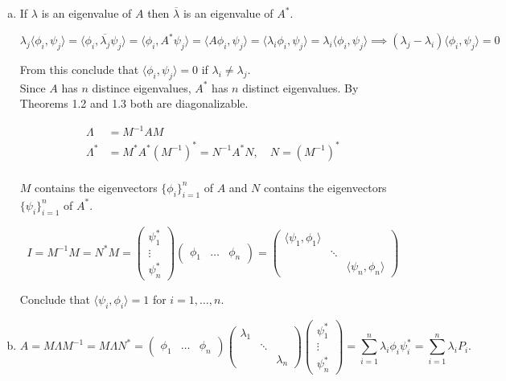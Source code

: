 \documentclass{article}
\begin{document}
\begin{enumerate}[a.]
\item If $\lambda$ is an eigenvalue of $A$ then $\overline{\lambda}$ is an eigenvalue of $A^*$. 

$$
\lambda_j \langle \phi_i, \psi_j \rangle 
= \langle \phi_i, \overline{\lambda_j} \psi_j \rangle
= \langle \phi_i, A^* \psi_j \rangle 
= \langle A\phi_i,\psi_j \rangle 
= \langle \lambda_i \phi_i ,\psi_j \rangle
= \lambda_i \langle \phi_i , \psi_j \rangle
\implies (\lambda_j - \lambda_i) \langle \phi_i , \psi_j \rangle = 0
$$

From this conclude that $\langle \phi_i,\psi_j \rangle = 0$ if $\lambda_i \neq \lambda_j$.\\

Since $A$ has $n$ distince eigenvalues, $A^*$ has $n$ distinct eigenvalues. By Theorems 1.2 and 1.3 both are diagonalizable.

\begin{align*}
\Lambda & =M^{-1}AM \\
\Lambda^* &= M^* A^* (M^{-1})^* = N^{-1}A^* N, \quad N= (M^{-1})^*\\
\end{align*}

$M$ contains the eigenvectors $\{\phi_i\}_{i=1}^n$ of $A$ and $N$ contains the eigenvectors $\{\psi_i\}_{i=1}^n$ of $A^*$. 

$$
I = M^{-1}M = N^*M = \begin{pmatrix}
\psi_1^* \\ \vdots \\ \psi_n^*
\end{pmatrix}
\begin{pmatrix}
\phi_1 & \dots & \phi_n
\end{pmatrix}
= \begin{pmatrix}
\langle \psi_1, \phi_1\rangle & & \\
 & \ddots & \\
  & & \langle \psi_n, \phi_n \rangle
\end{pmatrix}
$$

Conclude that $\langle \psi_i , \phi_i \rangle = 1$ for $i = 1,\dots , n$. 

\item

$$
A = M\Lambda M^{-1} = M \Lambda N^* 
= \begin{pmatrix}
\phi_1  & \dots & \phi_n
\end{pmatrix}
\begin{pmatrix}
\lambda_1 & & \\
& \ddots & \\
& & \lambda_n
\end{pmatrix}
\begin{pmatrix}
\psi_1^* \\ \vdots \\ \psi_n^*
\end{pmatrix}
= \sum_{i=1}^n \lambda_i \phi_i \psi_i^*= \sum_{i = 1}^n \lambda_iP_i.
$$


\end{enumerate}
\end{document}
